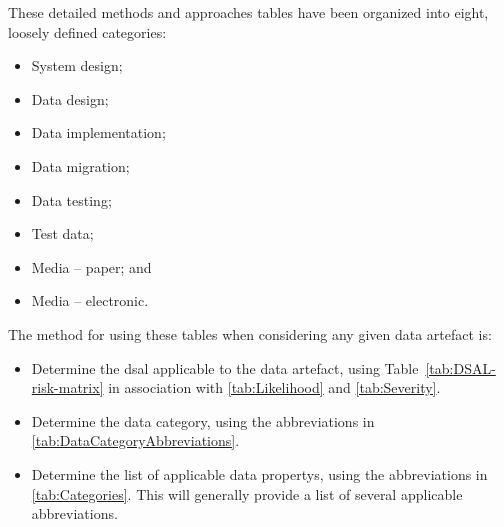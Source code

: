 These detailed methods and approaches tables have been organized into eight, loosely defined categories:
\begin{itemize}
  \item System design;
  \item Data design;
  \item Data implementation;
  \item Data migration;
  \item Data testing;
  \item Test data;
  \item Media -- paper; and 
  \item Media -- electronic.
\end{itemize}

The method for using these tables when considering any given \gls{data artefact} is:
\begin{itemize}
    \item Determine the \gls{dsal} applicable to the \gls{data artefact}, using Table~\ref*{tab:DSAL-risk-matrix} in association with \autoref{tab:Likelihood} and \autoref{tab:Severity}.
    \item Determine the data category, using the abbreviations in \autoref{tab:DataCategoryAbbreviations}.
    \item Determine the list of applicable \glspl{data property}, using the abbreviations in \autoref{tab:Categories}. This will generally provide a list of several applicable abbreviations.
\end{itemize}

